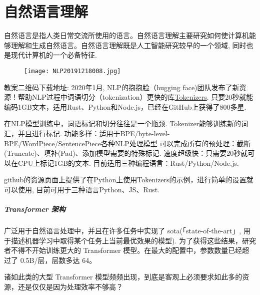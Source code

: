 \chapter{自然语言理解}\label{SSPChapter8}
\begin{tcolorbox}[colback=white!50,colframe=orange!50,title=自然语言]
\begin{center}
自然语言是指人类日常交流所使用的语言。自然语言理解主要研究如何使计算机能够理解和生成自然语言。自然语言理解既是人工智能研究较早的一个领域, 同时也是现代计算机的一个必备特征. \hfill
\end{center}
\end{tcolorbox}
\begin{figure}[H]
\centering
\texttt{[image: NLP20191218008.jpg]}
\end{figure}
教案二维码下载地址: 
2020年1月, NLP的抱抱脸（hugging face)团队发布了新资源！帮助NLP过程中词语切分（tokenization）更快的库\href{https://github.com/huggingface/tokenizers}{Tokenizers}.
只要20秒就能编码1GB文本，适用Rust、Python和Node.js，已经在GitHub上获得了800多星.

在NLP模型训练中，词语标记和切分往往是一个瓶颈. Tokenizer能够训练新的词汇，并且进行标记.
功能多样：适用于BPE/byte-level-BPE/WordPiece/SentencePiece各种NLP处理模型
可以完成所有的预处理：截断(Truncate)、填补(Pad)、添加模型需要的特殊标记.
速度超级快：只需要20秒就可以在CPU上标记1GB的文本.
目前适用三种编程语言：Rust/Python/Node.js.

github的资源页面上提供了在Python上使用Tokenizers的示例，进行简单的设置就可以使用, 目前可用于三种语言Python、JS、Rust.
\paragraph{Transformer 架构}
广泛用于自然语言处理中，并且在许多任务中实现了 sota(「state-of-the-art」, 用于描述机器学习中取得某个任务上当前最优效果的模型). 为了获得这些结果，研究者不得不开始训练更大的 Transformer 模型。在最大的配置中，参数数量已经超过了 0.5B/层，层数多达 64。

诸如此类的大型 Transformer 模型频频出现，到底是客观上必须要求如此多的资源，还是仅仅是因为处理效率不够高？

